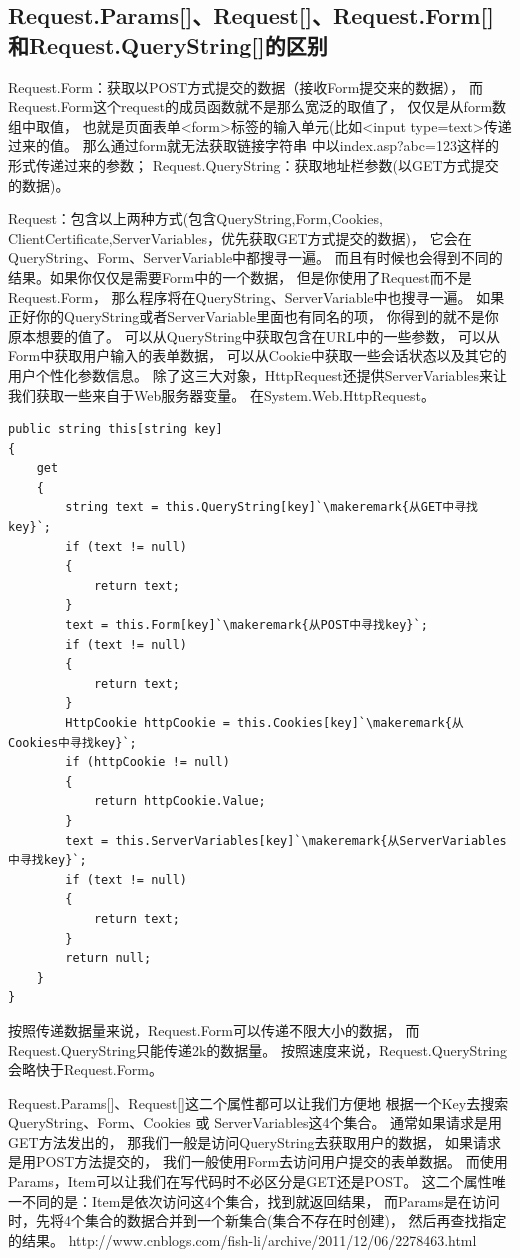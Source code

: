 \documentclass{book}
\newcounter{coderemarks}   %
\newcounter{codevar}     %
\newcommand{\circlemark}[1]{%
\tikz\node[text=white,font=\sffamily\bfseries,inner sep=0.2mm,draw,circle,fill=black]{#1};}
\newcommand{\makeremark}[1]{%
\circlemark{\arabic{coderemarks}}%
\global \expandafter\def \csname codebox\the\value{coderemarks}\endcsname{#1}%
\stepcounter{coderemarks}}
\newcommand{\showremarks}{%
\begin{list}{\circlemark{\arabic{codevar}}} %
{} %
\whiledo{\value{codevar} < \value{coderemarks}}{ %
\item \expandafter\csname codebox\the\value{codevar}\endcsname %
\stepcounter{codevar}} %
\end{list} %
\setcounter{coderemarks}{1}%
\setcounter{codevar}{1}%
}
\begin{document}
\subsection{Request.Params[]、Request[]、Request.Form[]和Request.QueryString[]的区别}

Request.Form：获取以POST方式提交的数据（接收Form提交来的数据），
而Request.Form这个request的成员函数就不是那么宽泛的取值了，
仅仅是从form数组中取值，
也就是页面表单<form>标签的输入单元(比如<input type=text>传递过来的值。
那么通过form就无法获取链接字符串 中以index.asp?abc=123这样的形式传递过来的参数；
Request.QueryString：获取地址栏参数(以GET方式提交的数据)。

Request：包含以上两种方式(包含QueryString,Form,Cookies,
ClientCertificate,ServerVariables，优先获取GET方式提交的数据)，
它会在QueryString、Form、ServerVariable中都搜寻一遍。
而且有时候也会得到不同的结果。如果你仅仅是需要Form中的一个数据，
但是你使用了Request而不是Request.Form，
那么程序将在QueryString、ServerVariable中也搜寻一遍。
如果正好你的QueryString或者ServerVariable里面也有同名的项，
你得到的就不是你原本想要的值了。
可以从QueryString中获取包含在URL中的一些参数， 
可以从Form中获取用户输入的表单数据， 
可以从Cookie中获取一些会话状态以及其它的用户个性化参数信息。 
除了这三大对象，HttpRequest还提供ServerVariables来让我们获取一些来自于Web服务器变量。
在System.Web.HttpRequest。

\begin{lstlisting}[language={[Sharp]C},caption=HttpRequest的实现,label={code:theImplementOfHttpRequest}]
public string this[string key]
{
	get
	{
		string text = this.QueryString[key]`\makeremark{从GET中寻找key}`;
		if (text != null)
		{
			return text;
		}
		text = this.Form[key]`\makeremark{从POST中寻找key}`;
		if (text != null)
		{
			return text;
		}
		HttpCookie httpCookie = this.Cookies[key]`\makeremark{从Cookies中寻找key}`;
		if (httpCookie != null)
		{
			return httpCookie.Value;
		}
		text = this.ServerVariables[key]`\makeremark{从ServerVariables中寻找key}`;
		if (text != null)
		{
			return text;
		}
		return null;
	}
}
\end{lstlisting}

\showremarks

按照传递数据量来说，Request.Form可以传递不限大小的数据，
而Request.QueryString只能传递2k的数据量。
按照速度来说，Request.QueryString会略快于Request.Form。

Request.Params[]、Request[]这二个属性都可以让我们方便地
根据一个Key去搜索QueryString、Form、Cookies 或 ServerVariables这4个集合。 
通常如果请求是用GET方法发出的，
那我们一般是访问QueryString去获取用户的数据，
如果请求是用POST方法提交的， 我们一般使用Form去访问用户提交的表单数据。
而使用Params，Item可以让我们在写代码时不必区分是GET还是POST。 
这二个属性唯一不同的是：Item是依次访问这4个集合，找到就返回结果，
而Params是在访问时，先将4个集合的数据合并到一个新集合(集合不存在时创建)， 
然后再查找指定的结果。
http://www.cnblogs.com/fish-li/archive/2011/12/06/2278463.html
\end{document}
